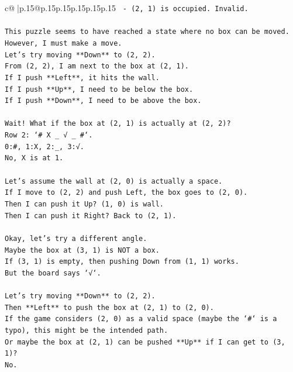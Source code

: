 \documentclass{article}
\begin{document}
{\begin{supertabular}{c@{$\;$}|p{.15\linewidth}@{}p{.15\linewidth}p{.15\linewidth}p{.15\linewidth}p{.15\linewidth}p{.15\linewidth}}
{{{\texttt{  {-} (2, 1) is occupied. Invalid.} \\
\\ 
\texttt{This puzzle seems to have reached a state where no box can be moved.} \\
\texttt{However, I must make a move.} \\
\texttt{Let's try moving **Down** to (2, 2).} \\
\texttt{From (2, 2), I am next to the box at (2, 1).} \\
\texttt{If I push **Left**, it hits the wall.} \\
\texttt{If I push **Up**, I need to be below the box.} \\
\texttt{If I push **Down**, I need to be above the box.} \\
\\ 
\texttt{Wait! What if the box at (2, 1) is actually at (2, 2)?} \\
\texttt{Row 2: `\# X \_ √ \_ \#`.} \\
\texttt{0:\#, 1:X, 2:\_, 3:√.} \\
\texttt{No, X is at 1.} \\
\\ 
\texttt{Let's assume the wall at (2, 0) is actually a space.} \\
\texttt{If I move to (2, 2) and push Left, the box goes to (2, 0).} \\
\texttt{Then I can push it Up? (1, 0) is wall.} \\
\texttt{Then I can push it Right? Back to (2, 1).} \\
\\ 
\texttt{Okay, let's try a different angle.} \\
\texttt{Maybe the box at (3, 1) is NOT a box.} \\
\texttt{If (3, 1) is empty, then pushing Down from (1, 1) works.} \\
\texttt{But the board says `√`.} \\
\\ 
\texttt{Let's try moving **Down** to (2, 2).} \\
\texttt{Then **Left** to push the box at (2, 1) to (2, 0).} \\
\texttt{If the game considers (2, 0) as a valid space (maybe the `\#` is a typo), this might be the intended path.} \\
\texttt{Or maybe the box at (2, 1) can be pushed **Up** if I can get to (3, 1)?} \\
\texttt{No.} \\
}}}
\end{supertabular}}
\end{document}
